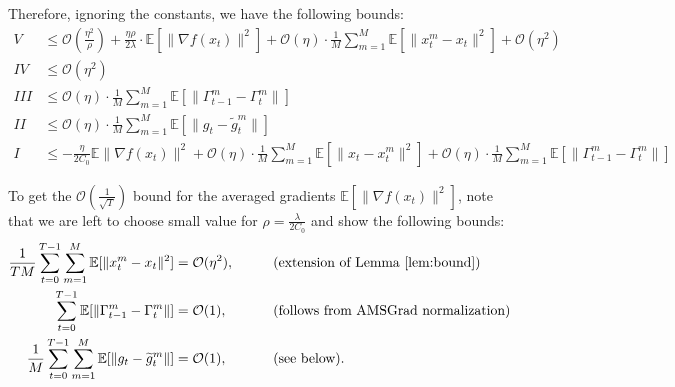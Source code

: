 Therefore, ignoring the constants, we have the following bounds:
\begin{align*}
V  &\leq \mathcal{O}\!\left(\frac{\eta^2}{\rho}\right)
   + \frac{\eta\rho}{2\lambda}\cdot\mathbb{E}[\|\nabla f(x_t)\|^2]
   + \mathcal{O}(\eta)\cdot\frac{1}{M}\sum_{m=1}^{M}\mathbb{E}[\|x_t^m - x_t\|^2]
   + \mathcal{O}(\eta^2) \\
IV &\leq \mathcal{O}(\eta^2) \\
III &\leq \mathcal{O}(\eta)\cdot\frac{1}{M}\sum_{m=1}^{M}\mathbb{E}[\|\Gamma_{t-1}^m - \Gamma_t^m\|] \\
II &\leq \mathcal{O}(\eta)\cdot\frac{1}{M}\sum_{m=1}^{M}\mathbb{E}[\|g_t - \widetilde{g}_t^m\|] \\
I  &\leq -\frac{\eta}{2C_0}\mathbb{E}\|\nabla f(x_t)\|^2
   + \mathcal{O}(\eta)\cdot\frac{1}{M}\sum_{m=1}^{M}\mathbb{E}\!\left[\|x_t - x_t^m\|^2\right]
   + \mathcal{O}(\eta)\cdot\frac{1}{M}\sum_{m=1}^{M}\mathbb{E}[\|\Gamma_{t-1}^m - \Gamma_t^m\|]
\end{align*}

To get the $\mathcal{O}\!\left(\frac{1}{\sqrt{T}}\right)$ bound for the averaged gradients $\mathbb{E}[\|\nabla f(x_t)\|^2]$, note that we are left to choose small value for $\rho = \frac{\lambda}{2C_0}$ and show the following bounds:
\begin{align*}
\frac{1}{TM}\sum_{t=0}^{T-1}\sum_{m=1}^{M}\mathbb{E}[\|x_t^m - x_t\|^2] &= \mathcal{O}(\eta^2), &\qquad&\text{(extension of Lemma~\ref{lem:bound})} \\
\sum_{t=0}^{T-1}\mathbb{E}[\|\Gamma_{t-1}^m - \Gamma_t^m\|] &= \mathcal{O}(1), &\qquad&\text{(follows from AMSGrad normalization)} \\
\frac{1}{M}\sum_{t=0}^{T-1}\sum_{m=1}^{M}\mathbb{E}[\|g_t - \widetilde{g}_t^m\|] &= \mathcal{O}(1), &\qquad&\text{(see below).}
\end{align*}


